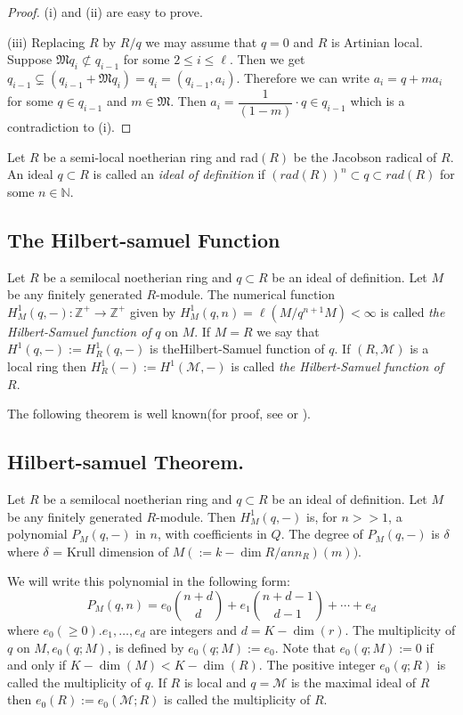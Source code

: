 \begin{proof}
(i) and (ii) are easy to prove.

(iii) Replacing $R$ by $R/q$ we may assume that $q=0$ and $R$ is
Artinian local. Suppose $\mathfrak{M} q_i \not \subset q_{i-1}$ for
some $2 \leq i \leq \ell$. Then we get
$q_{i-1}\subsetneq(q_{i-1}+\mathfrak{M}q_i)=q_i=(q_{i-1},
a_i)$. Therefore we can write $a_i =q+ma_i$ for some $q \in
q_{i-1}$ and $m \in \mathfrak{M}$. Then
$a_i=\dfrac{1}{(1-m)}\cdot q\in q_{i-1}$ which is a
contradiction to (i).
\end{proof}

Let $R$ be a semi-local noetherian ring and rad$(R)$ be the Jacobson
radical of $R$. An ideal $q\subset R$ is called an \textit{ ideal of
  definition} if $(rad (R))^n \subset q \subset rad (R)$ for some $n
\in \mathbb{N}$.  

\subsection{The Hilbert-samuel
  Function}\label{chap1:sec1:subsec1.2} %

Let $R$ be a semilocal noetherian ring and $q \subset R$ be an ideal
of definition. Let $M$ be any finitely generated $R$-module. The
numerical function $H^1_M(q,-): \mathbb{Z^+\to Z^+ }$ given by
$H^1_M(q,n) = \ell(M/q^{n+1} M)<\infty$ is called \textit{ the
  Hilbert-Samuel function of } $q$ on $M$. If $M=R$ we say that
$H^1(q,-):=H^1_R(q,-)$ is the\pageoriginale Hilbert-Samuel function of $q$. If
$(R,\mathscr{M})$ is a local ring then $H^1_R(-):=H^1(\mathcal{M},-)$
is called \textit{the Hilbert-Samuel function of }$R$.  

The following theorem is well known(for proof, see \cite{72} or \cite{106}). 

\subsection*{Hilbert-samuel Theorem.} 
Let $R$ be a semilocal
  noetherian ring and $q \subset R$ be an ideal of definition. Let $M$
  be any finitely generated $R$-module. Then $H^1_M(q,-)$ is, for $n>>
  1$, a  polynomial  $P_M(q,-)$ in $n$, with
coefficients in $Q$. The degree of  $P_M(q,-) $  is
$\delta$ where $\delta$ = Krull dimension of $M (:=k-\dim
R/ann_R)(m))$.  

We will write this polynomial in the following form: 
$$
P_M(q,n)=e_0 \binom{n+d}{d}+e_1\binom{n+d-1}{d-1}+\cdots+e_d 
$$
where $e_0(\geq 0). e_1,\ldots,e_d$ are integers and $d=K-\dim
(r)$. The  multiplicity of $q$  on $M, e_0 (q;M)$,
is defined by $ e_0 (q;M):=e_0$. Note that $ e_0 (q;M):=0$ if and only
if $K-\dim(M) < K-\dim (R)$. The positive integer $ e_0 (q; R)$ is
called the multiplicity of $q$. If $R$ is local and $q=\mathscr{M}$ is
the maximal ideal of $R$ then $ e_0(R):= e_0 (\mathscr{M}; R)$ is
called the multiplicity of $R$.  

